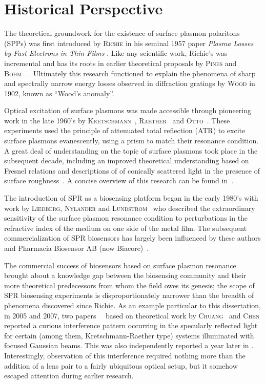\documentclass[a4paper,titlepage,onecolumn]{report}
\newcommand{\name}[1]{\textsc{#1}}
\begin{document}
\section{Historical Perspective}
The theoretical groundwork for the existence of surface plasmon polaritons
(SPPs) was first introduced by \name{Richie} in his seminal 1957 paper
\textit{Plasma Losses by Fast Electrons in Thin Films}
\cite{ritchie1957plasma}.  Like any scientific work, Richie's was
incremental and has its roots in earlier theoretical proposals by
\name{Pines} and
\name{Bohm}~\cite{bohm1951collective}~\cite{pines1952collective}.
Ultimately this research functioned to explain the phenomena of sharp and
spectrally narrow energy losses observed in diffraction gratings by
\name{Wood} in 1902, known as ``Wood's anomaly''.

Optical excitation of surface plasmons was made accessible through
pioneering work in the late 1960's by
\name{Kretschmann}~\cite{kretschmann1968},
\name{Raether}~\cite{raether1965springer} and
\name{Otto}~\cite{otto1968excitation}.  These experiments used the
principle of attenuated total reflection (ATR) to excite surface plasmons
evanescently, using a prism to match their resonance condition.  A great
deal of understanding on the topic of surface plasmons took place in the
subsequent decade, including an improved theoretical understanding based on
Fresnel relations \cite{chen1976excitation} and descriptions of of
conically scattered light in the presence of surface
roughness~\cite{simon1976directional}.  A concise overview of this research
can be found in~\cite{raether1997surface}.

The introduction of SPR as a biosensing platform began in the early 1980's
with work by \name{Liedberg}, \name{Nylander} and
\name{Lundstrom}~\cite{liedberg1983surface} who described the
extraordinary sensitivity of the surface plasmon resonance condition to
perturbations in the refractive index of the medium on one side of the
metal film.  The subsequent commercialization of SPR biosensors has largely
been influenced by these authors and Pharmacia Biosensor AB (now
Biacore)~\cite{liedberg1995biosensing}.

The commercial success of biosensors based on surface plasmon resonance
brought about a knowledge gap between the biosensing community and their
more theoretical predecessors from whom the field owes its genesis; the
scope of SPR biosensing experiments is disproportionately narrower than the
breadth of phenomena discovered since Richie.  As an example particular to
this dissertation, in 2005 and 2007, two
papers~\cite{andaloro2005optical}~\cite{simon2007observation} based on
theoretical work by \name{Chuang}~\cite{chuang1986lateral} and
\name{Chen} \cite{chen1976excitation} reported a curious interference
pattern occurring in the specularly reflected light for certain (among
them, Kretschmann-Raether type) systems illuminated with focused Gaussian
beams.  This was also independently reported a year later in
\cite{schumann2008near}.  Interestingly, observation of this interference
required nothing more than the addition of a lens pair to a fairly
ubiquitous optical setup, but it somehow escaped attention during earlier
research.  
\end{document}
